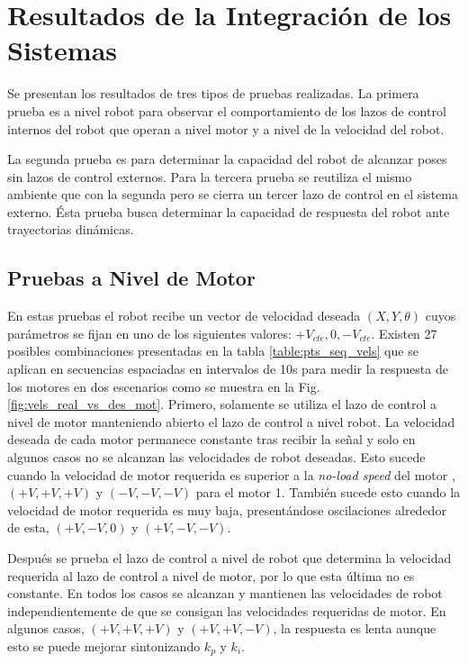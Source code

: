 \section{Resultados de la Integración de los Sistemas}
Se presentan los resultados de tres tipos de pruebas realizadas. La primera prueba es a nivel robot para observar el comportamiento de los lazos de control internos del robot que operan a nivel motor y a nivel de la velocidad del robot.  

La segunda prueba es para determinar la capacidad del robot de alcanzar poses sin lazos de control externos. Para la tercera prueba se reutiliza el mismo ambiente que con la segunda pero se cierra un tercer lazo de control en el sistema externo. Ésta prueba busca determinar la capacidad de respuesta del robot ante trayectorias dinámicas.

\subsection{Pruebas a Nivel de Motor}
En estas pruebas el robot recibe un vector de velocidad deseada $(X, Y,\theta)$ cuyos parámetros se fijan en uno de los siguientes valores: $+V_{cte}, 0, -V_{cte}$. 
Existen 27 posibles combinaciones presentadas en la tabla \ref{table:pts_seq_vels} que se aplican en secuencias espaciadas en intervalos de 10s para medir la respuesta de los motores en dos escenarios como se muestra en la Fig. \ref{fig:vels_real_vs_des_mot}. Primero, solamente se utiliza el lazo de control a nivel de motor manteniendo abierto el lazo de control a nivel robot. La velocidad deseada de cada motor permanece constante tras recibir la señal y solo en algunos casos no se alcanzan las velocidades de robot deseadas. Esto sucede cuando la velocidad de motor requerida es superior a la \emph{no-load speed} del motor ,$(+V, +V, +V )$ y $(-V, -V, -V) $ para el motor 1. También sucede esto cuando la velocidad de motor requerida es muy baja, presentándose oscilaciones alrededor de esta, $(+V, -V, 0) $ y  $(+V, -V, -V)$.

Después se prueba el lazo de control a nivel de robot que determina la velocidad requerida al lazo de control a nivel de motor, por lo que esta última no es constante. En todos los casos se alcanzan y mantienen las velocidades de robot independientemente de que se consigan las velocidades requeridas de motor. En algunos casos, $(+V, +V, +V )$ y $(+V, +V, -V)$, la respuesta es lenta aunque esto se puede mejorar sintonizando $k_p$ y $k_i$.



